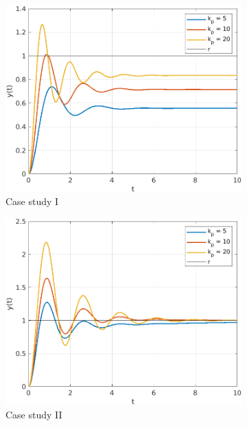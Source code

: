\documentclass{article}
\begin{document}
\begin{figure}[H]
    \centering
    \begin{subfigure}{0.325\textwidth}
        \centering
        \includegraphics[width = \textwidth]{figures/part_2_kp.png}
        \caption{Case study I}
    \end{subfigure}
    \begin{subfigure}{0.325\textwidth}
        \centering
        \includegraphics[width = \textwidth]{figures/part_2_ki.png}
        \caption{Case study II}
    \end{subfigure}
    \begin{subfigure}{0.325\textwidth}

\end{subfigure}
\end{figure}
\end{document}
